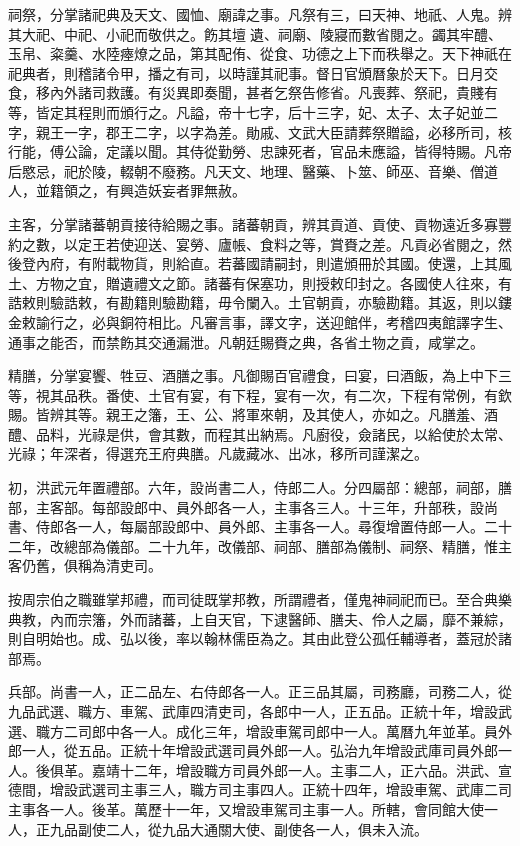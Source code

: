 祠祭，分掌諸祀典及天文、國恤、廟諱之事。凡祭有三，曰天神、地祇、人鬼。辨其大祀、中祀、小祀而敬供之。飭其壇遺、祠廟、陵寢而數省閱之。蠲其牢醴、玉帛、粢羹、水陸瘞燎之品，第其配侑、從食、功德之上下而秩舉之。天下神祇在祀典者，則稽諸令甲，播之有司，以時謹其祀事。督日官頒曆象於天下。日月交食，移內外諸司救護。有災異即奏聞，甚者乞祭告修省。凡喪葬、祭祀，貴賤有等，皆定其程則而頒行之。凡謚，帝十七字，后十三字，妃、太子、太子妃並二字，親王一字，郡王二字，以字為差。勛戚、文武大臣請葬祭贈謚，必移所司，核行能，傅公論，定議以聞。其侍從勤勞、忠諫死者，官品未應謚，皆得特賜。凡帝后愍忌，祀於陵，輟朝不廢務。凡天文、地理、醫藥、卜筮、師巫、音樂、僧道人，並籍領之，有興造妖妄者罪無赦。

主客，分掌諸蕃朝貢接待給賜之事。諸蕃朝貢，辨其貢道、貢使、貢物遠近多寡豐約之數，以定王若使迎送、宴勞、廬帳、食料之等，賞賚之差。凡貢必省閱之，然後登內府，有附載物貨，則給直。若蕃國請嗣封，則遣頒冊於其國。使還，上其風土、方物之宜，贈遺禮文之節。諸蕃有保塞功，則授敕印封之。各國使人往來，有誥敕則驗誥敕，有勘籍則驗勘籍，毋令闌入。土官朝貢，亦驗勘籍。其返，則以鏤金敕諭行之，必與銅符相比。凡審言事，譯文字，送迎館伴，考稽四夷館譯字生、通事之能否，而禁飭其交通漏泄。凡朝廷賜賚之典，各省土物之貢，咸掌之。

精膳，分掌宴饗、牲豆、酒膳之事。凡御賜百官禮食，曰宴，曰酒飯，為上中下三等，視其品秩。番使、土官有宴，有下程，宴有一次，有二次，下程有常例，有欽賜。皆辨其等。親王之籓，王、公、將軍來朝，及其使人，亦如之。凡膳羞、酒醴、品料，光祿是供，會其數，而程其出納焉。凡廚役，僉諸民，以給使於太常、光祿；年深者，得選充王府典膳。凡歲藏冰、出冰，移所司謹潔之。

初，洪武元年置禮部。六年，設尚書二人，侍郎二人。分四屬部：總部，祠部，膳部，主客部。每部設郎中、員外郎各一人，主事各三人。十三年，升部秩，設尚書、侍郎各一人，每屬部設郎中、員外郎、主事各一人。尋復增置侍郎一人。二十二年，改總部為儀部。二十九年，改儀部、祠部、膳部為儀制、祠祭、精膳，惟主客仍舊，俱稱為清吏司。

按周宗伯之職雖掌邦禮，而司徒既掌邦教，所謂禮者，僅鬼神祠祀而已。至合典樂典教，內而宗籓，外而諸蕃，上自天官，下逮醫師、膳夫、伶人之屬，靡不兼綜，則自明始也。成、弘以後，率以翰林儒臣為之。其由此登公孤任輔導者，蓋冠於諸部焉。

兵部。尚書一人，正二品左、右侍郎各一人。正三品其屬，司務廳，司務二人，從九品武選、職方、車駕、武庫四清吏司，各郎中一人，正五品。正統十年，增設武選、職方二司郎中各一人。成化三年，增設車駕司郎中一人。萬曆九年並革。員外郎一人，從五品。正統十年增設武選司員外郎一人。弘治九年增設武庫司員外郎一人。後俱革。嘉靖十二年，增設職方司員外郎一人。主事二人，正六品。洪武、宣德間，增設武選司主事三人，職方司主事四人。正統十四年，增設車駕、武庫二司主事各一人。後革。萬歷十一年，又增設車駕司主事一人。所轄，會同館大使一人，正九品副使二人，從九品大通關大使、副使各一人，俱未入流。

